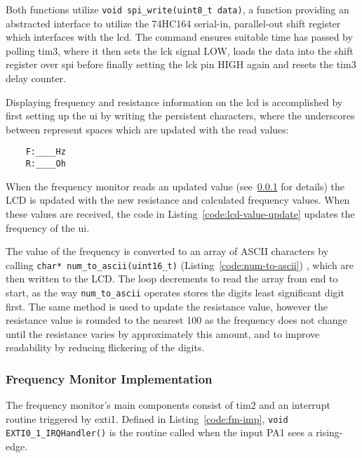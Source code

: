 Both functions utilize \lstinline{void spi_write(uint8_t data)}, a
function providing an abstracted interface to utilize the 74HC164
serial-in, parallel-out shift register which interfaces with the
\gls{lcd}. The command ensures suitable time has passed by polling
\gls{tim3}, where it then sets the \gls{lck} signal LOW, loads the data
into the shift register over \gls{spi} before finally setting the
\gls{lck} pin HIGH again and resets the \gls{tim3} delay counter.

Displaying frequency and resistance information on the \gls{lcd} is
accomplished by first setting up the \gls{ui} by writing the persistent
characters, where the underscores between represent spaces which are
updated with the read values:

\begin{lstlisting}
	F:____Hz
	R:____Oh
\end{lstlisting}

When the frequency monitor reads an updated value (see~\ref{sec:fm-imp}
for details) the LCD is updated with the new resistance and calculated
frequency values. When these values are received, the code in
Listing~\ref{code:lcd-value-update} updates the frequency of the \gls{ui}.


The value of the frequency is converted to an array of ASCII characters
by calling \lstinline{char* num_to_ascii(uint16_t)}
(Listing~\ref{code:num-to-ascii}) , which are then written to the LCD.
The loop decrements to read the array from end to start, as the way
\lstinline{num_to_ascii} operates stores the digits least significant
digit first. The same method is used to update the resistance value,
however the resistance value is rounded to the nearest 100 as the
frequency does not change until the resistance varies by approximately
this amount, and to improve readability by reducing flickering of the
digits.



\subsubsection{Frequency Monitor Implementation} \label{sec:fm-imp}


The frequency monitor's main components consist of \gls{tim2} and an
interrupt routine triggered by \gls{exti1}. Defined in
Listing~\ref{code:fm-imp}, \lstinline{void EXTI0_1_IRQHandler()} is the
routine called when the input PA1 sees a rising-edge.

